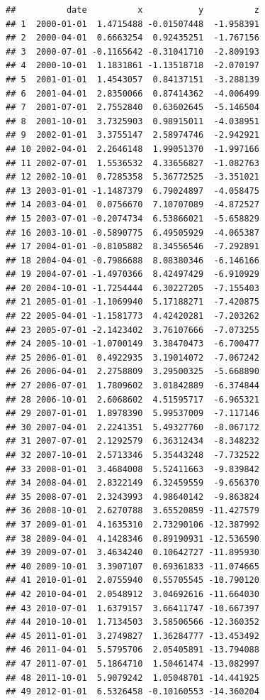 \documentclass[
]{article}
\begin{document}
\begin{verbatim}
##          date          x           y          z
## 1  2000-01-01  1.4715488 -0.01507448  -1.958391
## 2  2000-04-01  0.6663254  0.92435251  -1.767156
## 3  2000-07-01 -0.1165642 -0.31041710  -2.809193
## 4  2000-10-01  1.1831861 -1.13518718  -2.070197
## 5  2001-01-01  1.4543057  0.84137151  -3.288139
## 6  2001-04-01  2.8350066  0.87414362  -4.006499
## 7  2001-07-01  2.7552840  0.63602645  -5.146504
## 8  2001-10-01  3.7325903  0.98915011  -4.038951
## 9  2002-01-01  3.3755147  2.58974746  -2.942921
## 10 2002-04-01  2.2646148  1.99051370  -1.997166
## 11 2002-07-01  1.5536532  4.33656827  -1.082763
## 12 2002-10-01  0.7285358  5.36772525  -3.351021
## 13 2003-01-01 -1.1487379  6.79024897  -4.058475
## 14 2003-04-01  0.0756670  7.10707089  -4.872527
## 15 2003-07-01 -0.2074734  6.53866021  -5.658829
## 16 2003-10-01 -0.5890775  6.49505929  -4.065387
## 17 2004-01-01 -0.8105882  8.34556546  -7.292891
## 18 2004-04-01 -0.7986688  8.08380346  -6.146166
## 19 2004-07-01 -1.4970366  8.42497429  -6.910929
## 20 2004-10-01 -1.7254444  6.30227205  -7.155403
## 21 2005-01-01 -1.1069940  5.17188271  -7.420875
## 22 2005-04-01 -1.1581773  4.42420281  -7.203262
## 23 2005-07-01 -2.1423402  3.76107666  -7.073255
## 24 2005-10-01 -1.0700149  3.38470473  -6.700477
## 25 2006-01-01  0.4922935  3.19014072  -7.067242
## 26 2006-04-01  2.2758809  3.29500325  -5.668890
## 27 2006-07-01  1.7809602  3.01842889  -6.374844
## 28 2006-10-01  2.6068602  4.51595717  -6.965321
## 29 2007-01-01  1.8978390  5.99537009  -7.117146
## 30 2007-04-01  2.2241351  5.49327760  -8.067172
## 31 2007-07-01  2.1292579  6.36312434  -8.348232
## 32 2007-10-01  2.5713346  5.35443248  -7.732522
## 33 2008-01-01  3.4684008  5.52411663  -9.839842
## 34 2008-04-01  2.8322149  6.32459559  -9.656370
## 35 2008-07-01  2.3243993  4.98640142  -9.863824
## 36 2008-10-01  2.6270788  3.65520859 -11.427579
## 37 2009-01-01  4.1635310  2.73290106 -12.387992
## 38 2009-04-01  4.1428346  0.89190931 -12.536590
## 39 2009-07-01  3.4634240  0.10642727 -11.895930
## 40 2009-10-01  3.3907107  0.69361833 -11.074665
## 41 2010-01-01  2.0755940  0.55705545 -10.790120
## 42 2010-04-01  2.0548912  3.04692616 -11.664030
## 43 2010-07-01  1.6379157  3.66411747 -10.667397
## 44 2010-10-01  1.7134503  3.58506566 -12.360352
## 45 2011-01-01  3.2749827  1.36284777 -13.453492
## 46 2011-04-01  5.5795706  2.05405891 -13.794088
## 47 2011-07-01  5.1864710  1.50461474 -13.082997
## 48 2011-10-01  5.9079242  1.05048701 -14.441925
## 49 2012-01-01  6.5326458 -0.10160553 -14.360204

\end{verbatim}
\end{document}
